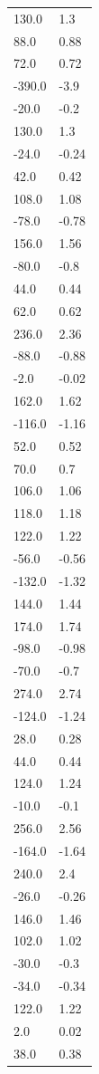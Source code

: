 \begin{longtable}{ll}
130.0 & 1.3 \\
88.0 & 0.88 \\
72.0 & 0.72 \\
-390.0 & -3.9 \\
-20.0 & -0.2 \\
130.0 & 1.3 \\
-24.0 & -0.24 \\
42.0 & 0.42 \\
108.0 & 1.08 \\
-78.0 & -0.78 \\
156.0 & 1.56 \\
-80.0 & -0.8 \\
44.0 & 0.44 \\
62.0 & 0.62 \\
236.0 & 2.36 \\
-88.0 & -0.88 \\
-2.0 & -0.02 \\
162.0 & 1.62 \\
-116.0 & -1.16 \\
52.0 & 0.52 \\
70.0 & 0.7 \\
106.0 & 1.06 \\
118.0 & 1.18 \\
122.0 & 1.22 \\
-56.0 & -0.56 \\
-132.0 & -1.32 \\
144.0 & 1.44 \\
174.0 & 1.74 \\
-98.0 & -0.98 \\
-70.0 & -0.7 \\
274.0 & 2.74 \\
-124.0 & -1.24 \\
28.0 & 0.28 \\
44.0 & 0.44 \\
124.0 & 1.24 \\
-10.0 & -0.1 \\
256.0 & 2.56 \\
-164.0 & -1.64 \\
240.0 & 2.4 \\
-26.0 & -0.26 \\
146.0 & 1.46 \\
102.0 & 1.02 \\
-30.0 & -0.3 \\
-34.0 & -0.34 \\
122.0 & 1.22 \\
2.0 & 0.02 \\
38.0 & 0.38 \\

\end{longtable}
